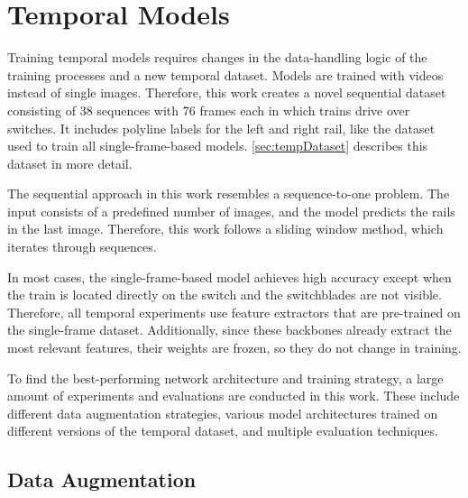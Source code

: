 \section{Temporal Models}
\label{sec:temporalModelsExperiments}

Training temporal models requires changes in the data-handling logic of the training processes and a new temporal dataset.
Models are trained with videos instead of single images.
Therefore, this work creates a novel sequential dataset consisting of 38 sequences with 76 frames each in which trains drive over switches.
It includes polyline labels for the left and right rail, like the dataset used to train all single-frame-based models.
\autoref{sec:tempDataset} describes this dataset in more detail.

The sequential approach in this work resembles a sequence-to-one problem.
The input consists of a predefined number of images, and the model predicts the rails in the last image.
Therefore, this work follows a sliding window method, which iterates through sequences.

In most cases, the single-frame-based model achieves high accuracy except when the train is located directly on the switch and the switchblades are not visible.
Therefore, all temporal experiments use feature extractors that are pre-trained on the single-frame dataset.
Additionally, since these backbones already extract the most relevant features, their weights are frozen, so they do not change in training.

To find the best-performing network architecture and training strategy, a large amount of experiments and evaluations are conducted in this work.
These include different data augmentation strategies, various model architectures trained on different versions of the temporal dataset, and multiple evaluation techniques.

\subsection{Data Augmentation}

